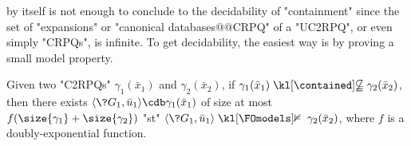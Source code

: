  by itself is not enough to conclude to the decidability of
"containment" since the set of "expansions" or "canonical databases@@CRPQ"
of a "UC2RPQ", or even simply "CRPQs", is infinite.
To get decidability, the easiest way is by proving a small model property.
\begin{proposition}
    \label{prop:pigeonssssssss}
    Given two "C2RPQs" $\gamma_1(\bar x_1)$ and $\gamma_2(\bar x_2)$, if $\gamma_1(\bar x_1) \notcontained \gamma_2(\bar x_2)$, then there exists $\tup{\?G_1, \bar u_1} \cdb \gamma_1(\bar x_1)$ of size at most $f(\size{\gamma_1}+\size{\gamma_2})$ "st"
    $\tup{\?G_1, \bar u_1} \notFOmodels \gamma_2(\bar x_2)$,
    where $f$ is a doubly-exponential function.
\end{proposition}

